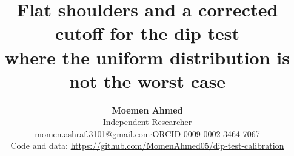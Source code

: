 \documentclass[11pt]{article}
\title{\textbf{Flat shoulders and a corrected cutoff for the dip test}\\[6pt]
{\large\color{black!65}where the uniform distribution is not the worst case}}
\author{\textbf{Moemen Ahmed}\\[4pt]
\normalsize Independent Researcher\\[4pt]
\small momen.ashraf.3101@gmail.com\quad$\cdot$\quad ORCID 0009-0002-3464-7067\\[3pt]
\small Code and data: {\urlstyle{same}\url{https://github.com/MomenAhmed05/dip-test-calibration}}}
\date{}
\theoremstyle{definition}
\theoremstyle{remark}
\begin{document}
\maketitle











\ifdefined\PCIVERSION\fi



\appendix


\end{document}
